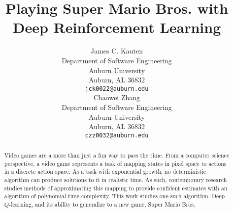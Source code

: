 \title{Playing Super Mario Bros. with Deep Reinforcement Learning}

\author{
	James C. Kauten \\
	Department of Software Engineering \\
	Auburn University \\
	Auburn, AL 36832 \\
	\texttt{jck0022@auburn.edu} \\
	\And
	Chaowei Zhang \\
	Department of Software Engineering \\
	Auburn University \\
	Auburn, AL 36832 \\
	\texttt{czz0032@auburn.edu} \\
}

\maketitle

\begin{abstract}

Video games are a more than just a fun way to pass the time. From a computer
science perspective, a video game represents a task of mapping states in
pixel space to actions in a discrete action space. As a task with exponential
growth, no deterministic algorithm can produce solutions to it in realistic
time. As such, contemporary research studies methods of approximating this
mapping to provide confident estimates with an algorithm of polynomial time
complexity. This work studies one such algorithm, Deep $Q$-learning, and its
ability to generalize to a new game, Super Mario Bros.

\end{abstract}
